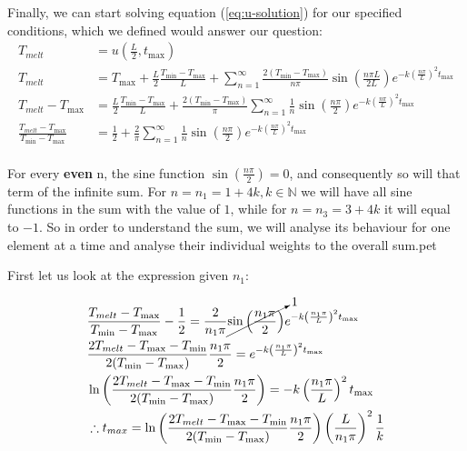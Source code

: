 Finally, we can start solving equation (\ref{eq:u-solution}) for our specified conditions, which we defined would answer our question:
\begin{equation*}
\begin{split}
T_{melt}&= u(\frac{L}{2}, t_{\max})
\\
T_{melt} &=
	T_{\max} + \frac{L}{2} \frac{ T_{\min}-T_{\max} }{ L }
	+
	\sum_{n=1}^{\infty}
	\frac{2(T_{\min}-T_{\max})}{n\pi}
	\sin \left(
		\frac{n\pi L}{2L}
	\right)
	e^{-k \left(
		\frac{n\pi}{L}
	\right)^2 t_{\max}}
\\
T_{melt} - T_{\max}&=
	\frac{L}{2} \frac{ T_{\min}-T_{\max} }{ L }
	+
	\frac{2(T_{\min}-T_{\max})}{\pi}
	\sum_{n=1}^{\infty}
		\frac{1}{n}
		\sin \left (\frac{n\pi}{2} \right)
		e^{
			-k \left(\frac{n\pi}{L} \right)^2 t_{\max}
		}
\\
\frac{T_{melt} - T_{\max}}{T_{\min}-T_{\max}}&=
	\frac{1}{2} + \frac{2}{\pi}
	\sum_{n=1}^{\infty}
	\frac{1}{n}
	\sin \left (\frac{n\pi}{2} \right)
	e^{
		-k \left(\frac{n\pi}{L} \right)^2 t_{\max}
	}
\\
\end{split}
\end{equation*}

For every \textbf{even} n, the sine function $\sin \left( \frac{n\pi}{2} \right) = 0$, and consequently so will that term of the infinite sum. For $ n = n_1 = 1 + 4k, k \in \mathbb{N} $ we will have all sine functions in the sum with the value of $1$, while for $n = n_3 = 3 + 4k$ it will equal to $-1$. 
So in order to understand the sum, we will analyse its behaviour for one element at a time and analyse their individual weights to the overall sum.pet 

First let us look at the expression given $n_1$:

\begin{equation*}
\begin{split}
&\frac{T_{melt} - T_{\max}}{T_{\min}-T_{\max}} - \frac{1}{2} =
	\frac{2}{n_1\pi}
	\cancelto{1}{
		\sin \left (\frac{n_1\pi}{2} \right)
	}
	e^{	-k \left(\frac{n_1\pi}{L} \right)^2 t_{\max}	}
\\
&\frac{2T_{melt} - T_{\max} - T_{\min}}{2(T_{\min}-T_{\max})} \frac{n_1\pi}{2}
	=
	 e^{	-k \left(\frac{n_1\pi}{L} \right)^2 t_{\max}	}
\\
&\ln \left(
	\frac{2T_{melt} - T_{\max} - T_{\min}}{2(T_{\min}-T_{\max})} \frac{n_1\pi}{2}
\right)
=
-k \left(\frac{n_1\pi}{L} \right)^2 t_{\max}
\\
&\therefore t_{max} =
	\ln \left(
		\frac{2T_{melt} - T_{\max} - T_{\min}}{2(T_{\min}-T_{\max})} \frac{n_1\pi}{2}
	\right)
	\left(
		\frac{L}{n_1\pi}
	\right)^2
	\frac{1}{k}
\end{split}
\end{equation*}

